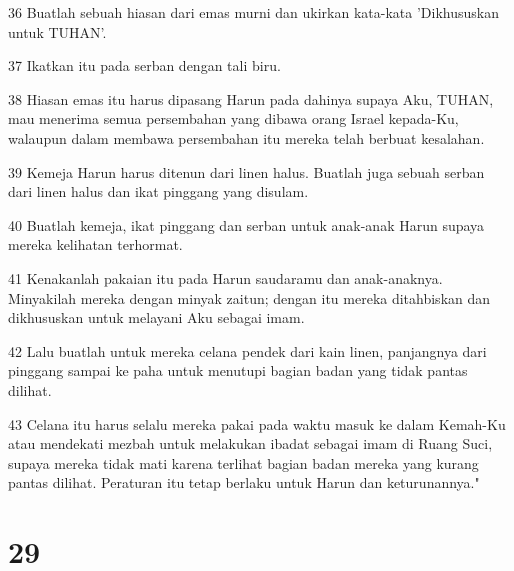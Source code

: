 \par 36 Buatlah sebuah hiasan dari emas murni dan ukirkan kata-kata 'Dikhususkan untuk TUHAN'.
\par 37 Ikatkan itu pada serban dengan tali biru.
\par 38 Hiasan emas itu harus dipasang Harun pada dahinya supaya Aku, TUHAN, mau menerima semua persembahan yang dibawa orang Israel kepada-Ku, walaupun dalam membawa persembahan itu mereka telah berbuat kesalahan.
\par 39 Kemeja Harun harus ditenun dari linen halus. Buatlah juga sebuah serban dari linen halus dan ikat pinggang yang disulam.
\par 40 Buatlah kemeja, ikat pinggang dan serban untuk anak-anak Harun supaya mereka kelihatan terhormat.
\par 41 Kenakanlah pakaian itu pada Harun saudaramu dan anak-anaknya. Minyakilah mereka dengan minyak zaitun; dengan itu mereka ditahbiskan dan dikhususkan untuk melayani Aku sebagai imam.
\par 42 Lalu buatlah untuk mereka celana pendek dari kain linen, panjangnya dari pinggang sampai ke paha untuk menutupi bagian badan yang tidak pantas dilihat.
\par 43 Celana itu harus selalu mereka pakai pada waktu masuk ke dalam Kemah-Ku atau mendekati mezbah untuk melakukan ibadat sebagai imam di Ruang Suci, supaya mereka tidak mati karena terlihat bagian badan mereka yang kurang pantas dilihat. Peraturan itu tetap berlaku untuk Harun dan keturunannya."

\chapter{29}

